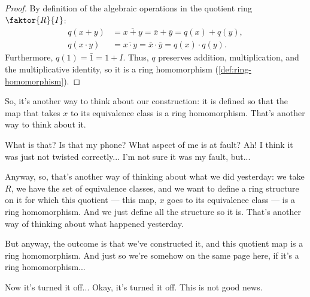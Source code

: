 \begin{content}


\begin{proof}
By definition of the algebraic operations in the quotient ring $\faktor{R}{I}$:
\begin{align}
q(x + y) &= \overline{x + y} = \bar{x} + \bar{y} = q(x) + q(y), \label{eq:q-preserves-add} \\
q(x \cdot y) &= \overline{x \cdot y} = \bar{x} \cdot \bar{y} = q(x) \cdot q(y). \label{eq:q-preserves-mult}
\end{align}
Furthermore, $q(1) = \bar{1} = 1 + I$. Thus, $q$ preserves addition, multiplication, and the multiplicative identity, so it is a ring homomorphism (\cref{def:ring-homomorphism}).
\end{proof}
\end{content}

\begin{speech}[00:02:45 - 00:04:13]
So, it's another way to think about our construction: it is defined so that the map that takes $x$ to its equivalence class is a ring homomorphism. That's another way to think about it.

What is that? Is that my phone?  What aspect of me is at fault?  Ah! I think it was just not twisted correctly... I'm not sure it was my fault, but... 

Anyway, so, that's another way of thinking about what we did yesterday: we take $R$, we have the set of equivalence classes, and we want to define a ring structure on it for which this quotient --- this map, $x$ goes to its equivalence class --- is a ring homomorphism. And we just define all the structure so it is. That's another way of thinking about what happened yesterday.

But anyway, the outcome is that we've constructed it, and this quotient map is a ring homomorphism. And just so we're somehow on the same page here, if it's a ring homomorphism...

Now it's turned it off...  Okay, it's turned it off. This is not good news.
\end{speech}

